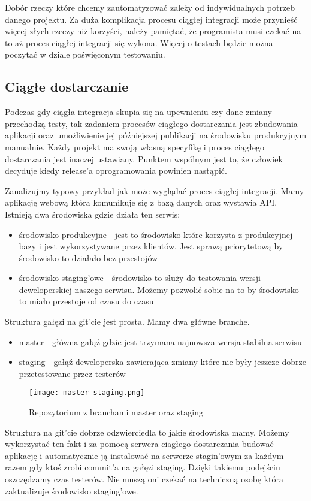 Dobór rzeczy które chcemy zautomatyzować zależy od indywidualnych potrzeb danego projektu. Za duża komplikacja procesu ciągłej integracji może przynieść więcej złych rzeczy niż korzyści, należy pamiętać, że programista musi czekać na to aż proces ciągłej integracji się wykona.
Więcej o testach będzie można poczytać w dziale poświęconym testowaniu. 
\subsection{Ciągłe dostarczanie}
Podczas gdy ciągła integracja skupia się na upewnieniu czy dane zmiany przechodzą testy, tak zadaniem procesów ciągłego dostarczania jest zbudowania aplikacji oraz umożliwienie jej późniejszej publikacji na środowisku produkcyjnym manualnie. Każdy projekt ma swoją własną specyfikę i proces ciągłego dostarczania jest inaczej ustawiany. Punktem wspólnym jest to, że człowiek decyduje kiedy release'a oprogramowania powinien nastąpić.
\par
Zanalizujmy typowy przykład jak może wyglądać proces ciągłej integracji. Mamy aplikację webową która komunikuje się z bazą danych oraz wystawia API. Istnieją dwa środowiska gdzie działa ten serwis:
\begin{itemize}
    \item środowisko produkcyjne - jest to środowisko które korzysta z produkcyjnej bazy i jest wykorzystywane przez klientów. Jest sprawą priorytetową by środowisko to działało bez przestojów
    \item środowisko staging'owe - środowisko to służy do testowania wersji deweloperskiej naszego serwisu. Możemy pozwolić sobie na to by środowisko to miało przestoje od czasu do czasu
\end{itemize}
Struktura gałęzi na git'cie jest prosta. Mamy dwa główne branche.
\begin{itemize}
    \item master - główna gałąź gdzie jest trzymana najnowsza wersja stabilna serwisu
    \item staging - gałąź deweloperska zawierająca zmiany które nie były jeszcze dobrze przetestowane przez testerów
\end{itemize}
\begin{figure}[htbp]
    \centering
    \texttt{[image: master-staging.png]}
    \caption{Repozytorium z branchami master oraz staging}
    \label{fig:git}
\end{figure}
Struktura na git'cie dobrze odzwierciedla to jakie środowiska mamy. Możemy wykorzystać ten fakt i za pomocą serwera ciagłego dostarczania budować aplikację i automatycznie ją instalować na serwerze stagin'owym za każdym razem gdy ktoś zrobi commit'a na gałęzi staging. Dzięki takiemu podejściu oszczędzamy czas testerów. Nie muszą oni czekać na techniczną osobę która zaktualizuje środowisko staging'owe. 
